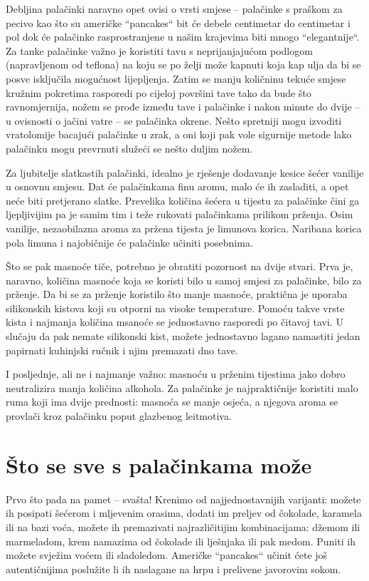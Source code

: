 \documentclass[11pt,twocolumn,english]{article}
\begin{document}
Debljina palačinki naravno opet ovisi o vrsti smjese – palačinke s praškom za
pecivo kao što su američke “pancakes“ bit će debele centimetar do centimetar i
pol dok će palačinke rasprostranjene u našim krajevima biti mnogo “elegantnije“.
Za tanke palačinke važno je koristiti tavu s neprijanjajućom podlogom
(napravljenom od teflona) na koju se po želji može kapnuti koja kap ulja da bi se
posve isključila mogućnost lijepljenja. Zatim se manju količninu tekuće smjese
kružnim pokretima rasporedi po cijeloj površini tave tako da bude što
ravnomjernija, nožem se prođe između tave i palačinke i nakon minute do dvije – u
ovisnosti o jačini vatre – se palačinka okrene. Nešto spretniji mogu izvoditi
vratolomije bacajući palačinke u zrak, a oni koji pak vole sigurnije metode lako
palačinku mogu prevrnuti služeći se nešto duljim nožem.

Za ljubitelje slatkastih palačinki, idealno je rješenje dodavanje kesice šećer
vanilije u osnovnu smjesu. Dat će palačinkama finu aromu, malo će ih zasladiti, a
opet neće biti pretjerano slatke. Prevelika količina šećera u tijestu za
palačinke čini ga ljepljivijim pa je samim tim i teže rukovati palačinkama
prilikom prženja. Osim vanilije, nezaobilazna aroma za pržena tijesta je limunova
korica. Naribana korica pola limuna i najobičnije će palačinke učiniti posebnima.

Što se pak masnoće tiče, potrebno je obratiti pozornost na dvije stvari. Prva je,
naravno, količina masnoće koja se koristi bilo u samoj smjesi za palačinke, bilo
za prženje. Da bi se za prženje koristilo što manje masnoće, praktična je uporaba
silikonskih kistova koji su otporni na visoke temperature. Pomoću takve vrste
kista i najmanja količina msanoće se jednostavno rasporedi po čitavoj tavi. U
slučaju da pak nemate silikonski kist, možete jednostavno lagano namastiti jedan
papirnati kuhinjski ručnik i njim premazati dno tave.

I posljednje, ali ne i najmanje važno: masnoću u prženim tijestima jako dobro
neutralizira manja količina alkohola. Za palačinke je najpraktičnije koristiti
malo ruma koji ima dvije prednosti: masnoća se manje osjeća, a njegova aroma se
provlači kroz palačinku poput glazbenog leitmotiva.

\section{Što se sve s palačinkama može}
Prvo što pada na pamet – svašta! Krenimo od najjednostavnijih varijanti: možete
ih posipati šećerom i mljevenim orasima, dodati im preljev od čokolade, karamela
ili na bazi voća, možete ih premazivati najrazličitijim kombinacijama: džemom ili
marmeladom, krem namazima od čokolade ili lješnjaka ili pak medom. Puniti ih
možete svježim voćem ili sladoledom. Američke “pancakes“ učinit ćete još
autentičnijima poslužite li ih naslagane na hrpu i prelivene javorovim sokom.
\end{document}
